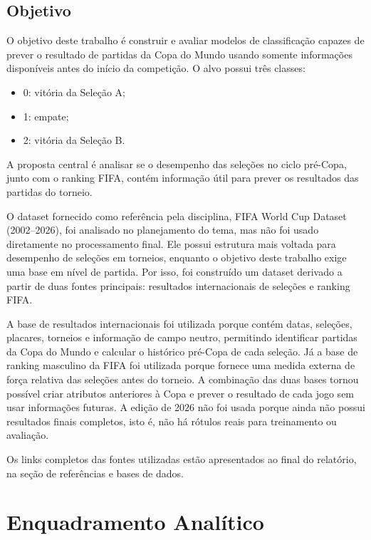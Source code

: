\documentclass[12pt,a4paper]{article}
\begin{document}
\subsection{Objetivo}

O objetivo deste trabalho é construir e avaliar modelos de classificação capazes
de prever o resultado de partidas da Copa do Mundo usando somente informações
disponíveis antes do início da competição. O alvo possui três classes:

\begin{itemize}
    \item 0: vitória da Seleção A;
    \item 1: empate;
    \item 2: vitória da Seleção B.
\end{itemize}

A proposta central é analisar se o desempenho das seleções no ciclo pré-Copa,
junto com o ranking FIFA, contém informação útil para prever os resultados das
partidas do torneio.

O dataset fornecido como referência pela disciplina, FIFA World Cup Dataset
(2002--2026), foi analisado no planejamento do tema, mas não foi usado
diretamente no processamento final. Ele possui estrutura mais voltada para
desempenho de seleções em torneios, enquanto o objetivo deste trabalho exige uma
base em nível de partida. Por isso, foi construído um dataset derivado a partir
de duas fontes principais: resultados internacionais de seleções e ranking FIFA.

A base de resultados internacionais foi utilizada porque contém datas, seleções,
placares, torneios e informação de campo neutro, permitindo identificar partidas
da Copa do Mundo e calcular o histórico pré-Copa de cada seleção. Já a base de
ranking masculino da FIFA foi utilizada porque fornece uma medida externa de
força relativa das seleções antes do torneio. A combinação das duas bases tornou
possível criar atributos anteriores à Copa e prever o resultado de cada jogo sem
usar informações futuras. A edição de 2026 não foi usada porque ainda não possui
resultados finais completos, isto é, não há rótulos reais para treinamento ou
avaliação.

Os links completos das fontes utilizadas estão apresentados ao final do
relatório, na seção de referências e bases de dados.

\section{Enquadramento Analítico}
\end{document}
